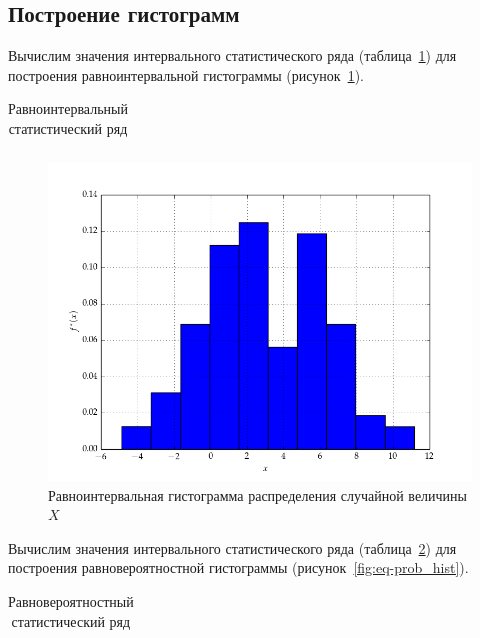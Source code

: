 \documentclass[14pt,hidelinks]{extarticle}
\begin{document}
\subsection{Построение гистограмм}

Вычислим значения интервального статистического ряда (таблица~\ref{tabl:eq-size_int}) для построения
равноинтервальной гистограммы (рисунок~\ref{fig:eq-size_hist}).

\renewcommand{\tabcolsep}{1.5em} 
\begin{table}[h!]
  \centering
  \caption{Равноинтервальный статистический ряд\label{tabl:eq-size_int}}
  \small
  \begin{tabular}{|c|c|c|c|c|c|c|}
    \hline
    
  \end{tabular}
\end{table}

\begin{figure}[h!]
  \centering
  \includegraphics[width=1\linewidth]{pic/stat_series_eq_size.png}
  \caption{Равноинтервальная гистограмма распределения случайной величины $ X $\label{fig:eq-size_hist}}
\end{figure}

Вычислим значения интервального статистического ряда (таблица~\ref{tabl:eq-prob_int}) для построения
равновероятностной гистограммы (рисунок~\ref{fig:eq-prob_hist}).
\begin{table}[h!]
	\centering
	\caption{Равновероятностный статистический ряд\label{tabl:eq-prob_int}}
        \small
	\begin{tabular}{|c|c|c|c|c|c|c|}
		\hline
		
	\end{tabular}
\end{table}
\end{document}
